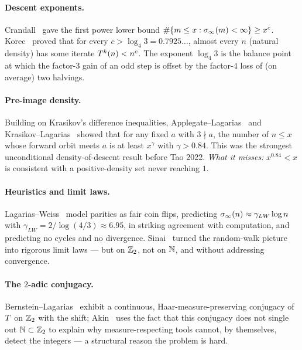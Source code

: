 \documentclass[11pt]{amsart}
\theoremstyle{definition}
\theoremstyle{remark}
\begin{document}
\paragraph{Descent exponents.}
Crandall~\citep{crandall1978} gave the first power lower bound $\#\{m\le x:\sigma_\infty(m)<\infty\}\ge x^c$.
Korec~\citep{korec1994} %
proved that for every $c>\log_4 3 = 0.7925\ldots$, almost every $n$ (natural density) has some
iterate $T^k(n)<n^c$. The exponent $\log_4 3$ is the balance point at which the factor-$3$ gain of an
odd step is offset by the factor-$4$ loss of (on average) two halvings.

\paragraph{Pre-image density.}
Building on Krasikov's difference inequalities, Applegate--Lagarias~\citep{applegatelagarias1995} and
Krasikov--Lagarias~\citep{krasikov2003} showed that for any fixed $a$ with $3\nmid a$, the number of
$n\le x$ whose forward orbit meets $a$ is at least $x^{\gamma}$ with $\gamma>0.84$. This was the
strongest unconditional density-of-descent result before Tao 2022. \emph{What it misses:} $x^{0.84}<x$
is consistent with a positive-density set never reaching $1$.

\paragraph{Heuristics and limit laws.}
Lagarias--Weiss~\citep{lagariasweiss1992} model parities as fair coin flips, predicting
$\sigma_\infty(n)\approx \gamma_{LW}\log n$ with $\gamma_{LW}=2/\log(4/3)\approx 6.95$, in striking
agreement with computation, and predicting no cycles and no divergence. Sinai~\citep{sinai2003} turned
the random-walk picture into rigorous limit laws --- but on $\mathbb{Z}_2$, not on $\mathbb{N}$, and without
addressing convergence.

\paragraph{The $2$-adic conjugacy.}
Bernstein--Lagarias~\citep{bernsteinlagarias1996} exhibit a continuous, Haar-measure-preserving
conjugacy of $T$ on $\mathbb{Z}_2$ with the shift; Akin~\citep{akin2004} %
uses the fact that this conjugacy does not single out $\mathbb{N}\subset\mathbb{Z}_2$ to explain why measure-respecting
tools cannot, by themselves, detect the integers --- a structural reason the problem is hard.
\end{document}
